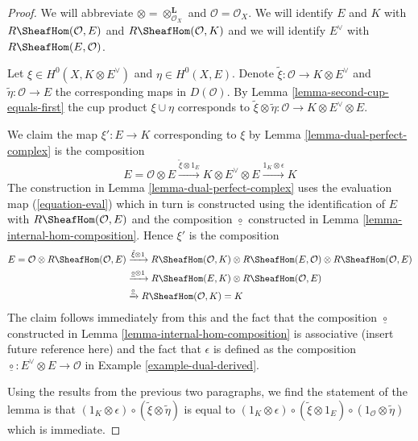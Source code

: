 \begin{proof}
We will abbreviate $\otimes = \otimes_{\mathcal{O}_X}^\mathbf{L}$
and $\mathcal{O} = \mathcal{O}_X$. We will identify $E$ and $K$
with $R\SheafHom(\mathcal{O}, E)$ and $R\SheafHom(\mathcal{O}, K)$
and we will identify $E^\vee$ with $R\SheafHom(E, \mathcal{O})$.

\medskip\noindent
Let $\xi \in H^0(X, K \otimes E^\vee)$ and $\eta \in H^0(X, E)$.
Denote $\tilde \xi : \mathcal{O} \to K \otimes E^\vee$ and
$\tilde \eta : \mathcal{O} \to E$ the corresponding maps in
$D(\mathcal{O})$. By Lemma \ref{lemma-second-cup-equals-first}
the cup product $\xi \cup \eta$ corresponds to
$\tilde \xi \otimes \tilde \eta : \mathcal{O} \to
K \otimes E^\vee \otimes E$.

\medskip\noindent
We claim the map $\xi' : E \to K$ corresponding to $\xi$ by
Lemma \ref{lemma-dual-perfect-complex} is the composition
$$
E = \mathcal{O} \otimes E
\xrightarrow{\tilde \xi \otimes 1_E}
K \otimes E^\vee \otimes E
\xrightarrow{1_K \otimes \epsilon}
K
$$
The construction in Lemma \ref{lemma-dual-perfect-complex}
uses the evaluation map (\ref{equation-eval}) which in turn
is constructed using the identification of $E$ with
$R\SheafHom(\mathcal{O}, E)$ and the composition
$\underline{\circ}$ constructed
in Lemma \ref{lemma-internal-hom-composition}.
Hence $\xi'$ is the composition
\begin{align*}
E = \mathcal{O} \otimes
R\SheafHom(\mathcal{O}, E)
& \xrightarrow{\tilde \xi \otimes 1}
R\SheafHom(\mathcal{O}, K) \otimes
R\SheafHom(E, \mathcal{O}) \otimes
R\SheafHom(\mathcal{O}, E) \\
& \xrightarrow{\underline{\circ} \otimes 1}
R\SheafHom(E, K) \otimes R\SheafHom(\mathcal{O}, E) \\
& \xrightarrow{\underline{\circ}}
R\SheafHom(\mathcal{O}, K) = K
\end{align*}
The claim follows immediately from this and the fact that
the composition $\underline{\circ}$ constructed in
Lemma \ref{lemma-internal-hom-composition} is associative
(insert future reference here) and the fact that $\epsilon$
is defined as the composition
$\underline{\circ} : E^\vee \otimes E \to \mathcal{O}$ in
Example \ref{example-dual-derived}.

\medskip\noindent
Using the results from the previous two paragraphs, we find
the statement of the lemma is that
$(1_K \otimes \epsilon) \circ (\tilde \xi \otimes \tilde \eta)$
is equal to
$(1_K \otimes \epsilon) \circ (\tilde \xi \otimes 1_E)
\circ (1_\mathcal{O} \otimes \tilde \eta)$
which is immediate.
\end{proof}




